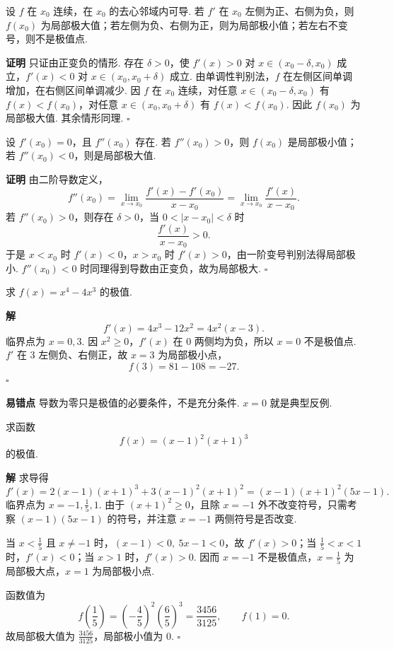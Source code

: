 \documentclass[fontset=fandol]{ctexart}
\newenvironment{proofdetail}{\par\noindent\textbf{证明}\quad}{\hfill$\square$\par\vspace{0.8em}}
\newenvironment{solution}{\par\noindent\textbf{解}\quad}{\hfill$\square$\par\vspace{0.8em}}
\newenvironment{warning}{\par\noindent\textbf{易错点}\quad}{\par\vspace{0.8em}}
\begin{document}
\begin{theorem}[一阶导数变号判别法]
设 $f$ 在 $x_0$ 连续，在 $x_0$ 的去心邻域内可导. 若 $f'$ 在 $x_0$ 左侧为正、右侧为负，则 $f(x_0)$ 为局部极大值；若左侧为负、右侧为正，则为局部极小值；若左右不变号，则不是极值点.
\end{theorem}
\begin{proofdetail}
只证由正变负的情形. 存在 $\delta>0$，使 $f'(x)>0$ 对 $x\in(x_0-\delta,x_0)$ 成立，$f'(x)<0$ 对 $x\in(x_0,x_0+\delta)$ 成立. 由单调性判别法，$f$ 在左侧区间单调增加，在右侧区间单调减少. 因 $f$ 在 $x_0$ 连续，对任意 $x\in(x_0-\delta,x_0)$ 有 $f(x)<f(x_0)$，对任意 $x\in(x_0,x_0+\delta)$ 有 $f(x)<f(x_0)$. 因此 $f(x_0)$ 为局部极大值. 其余情形同理.
\end{proofdetail}

\begin{theorem}[二阶导数判别法]
设 $f'(x_0)=0$，且 $f''(x_0)$ 存在. 若 $f''(x_0)>0$，则 $f(x_0)$ 是局部极小值；若 $f''(x_0)<0$，则是局部极大值.
\end{theorem}
\begin{proofdetail}
由二阶导数定义，
\[
f''(x_0)=\lim_{x\to x_0}\frac{f'(x)-f'(x_0)}{x-x_0}
=\lim_{x\to x_0}\frac{f'(x)}{x-x_0}.
\]
若 $f''(x_0)>0$，则存在 $\delta>0$，当 $0<|x-x_0|<\delta$ 时
\[
\frac{f'(x)}{x-x_0}>0.
\]
于是 $x<x_0$ 时 $f'(x)<0$，$x>x_0$ 时 $f'(x)>0$，由一阶变号判别法得局部极小. $f''(x_0)<0$ 时同理得到导数由正变负，故为局部极大.
\end{proofdetail}

\begin{example}[极值]
求 $f(x)=x^4-4x^3$ 的极值.
\end{example}
\begin{solution}
\[
f'(x)=4x^3-12x^2=4x^2(x-3).
\]
临界点为 $x=0,3$. 因 $x^2\geq0$，$f'(x)$ 在 $0$ 两侧均为负，所以 $x=0$ 不是极值点. $f'$ 在 $3$ 左侧负、右侧正，故 $x=3$ 为局部极小点，
\[
f(3)=81-108=-27.
\]
\end{solution}
\begin{warning}
导数为零只是极值的必要条件，不是充分条件. $x=0$ 就是典型反例.
\end{warning}

\begin{example}[极值]
求函数
\[
f(x)=(x-1)^2(x+1)^3
\]
的极值.
\end{example}
\begin{solution}
求导得
\[
f'(x)=2(x-1)(x+1)^3+3(x-1)^2(x+1)^2
=(x-1)(x+1)^2(5x-1).
\]
临界点为 $x=-1,\frac15,1$. 由于 $(x+1)^2\geq0$，且除 $x=-1$ 外不改变符号，只需考察 $(x-1)(5x-1)$ 的符号，并注意 $x=-1$ 两侧符号是否改变.

当 $x<\frac15$ 且 $x\neq-1$ 时，$(x-1)<0,\ 5x-1<0$，故 $f'(x)>0$；当 $\frac15<x<1$ 时，$f'(x)<0$；当 $x>1$ 时，$f'(x)>0$. 因而 $x=-1$ 不是极值点，$x=\frac15$ 为局部极大点，$x=1$ 为局部极小点.

函数值为
\[
f\left(\frac15\right)=\left(-\frac45\right)^2\left(\frac65\right)^3=\frac{3456}{3125},\qquad
f(1)=0.
\]
故局部极大值为 $\frac{3456}{3125}$，局部极小值为 $0$.
\end{solution}
\end{document}
